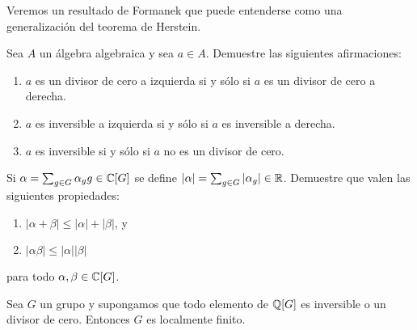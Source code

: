 
Veremos un resultado de Formanek que puede entenderse como una generalización
del teorema de Herstein. 

\begin{exercise}
	Sea $A$ un álgebra algebraica y sea $a\in A$. Demuestre las siguientes
	afirmaciones:
	\begin{enumerate}
		\item $a$ es un divisor de cero a izquierda si y sólo si $a$ es un
			divisor de cero a derecha.
		\item $a$ es inversible a izquierda si y sólo si $a$ es inversible a
			derecha.
		\item $a$ es inversible si y sólo si $a$ no es un divisor de cero.
	\end{enumerate}
\end{exercise}


\begin{exercise}
	\label{exa:norma}
	Si $\alpha=\sum_{g\in G}\alpha_gg\in\mathbb{C}[G]$ se define $|\alpha|=\sum_{g\in
	G}|\alpha_g|\in\mathbb{R}$. Demuestre que valen las siguientes propiedades:
	\begin{enumerate}
		\item $|\alpha+\beta|\leq|\alpha|+|\beta|$, y 
		\item $|\alpha\beta|\leq|\alpha||\beta|$ 
	\end{enumerate}
	para todo $\alpha,\beta\in\mathbb{C}[G]$.
\end{exercise}

\begin{theorem}
	\label{thm:FormanekQ}
	Sea $G$ un grupo y supongamos que todo elemento de $\mathbb{Q}[G]$ es inversible o
	un divisor de cero. Entonces $G$ es localmente finito.
\end{theorem}

